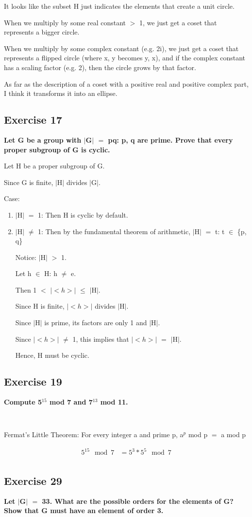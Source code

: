 \documentclass{article}
\newcommand{\mt}[1]{\ensuremath{#1}}
\newcommand\ssc[2][\DefaultOpt]{%
  \def\DefaultOpt{#2}%
  \subsection[#1]{#2}%
}
\newcommand{\elist}{\end{enumerate}}
\newcommand{\bilist}{\begin{enumerate}[label=\roman*)]}
\newcommand{\mem}{\mt{\in} }
\newcommand{\av}[1]{\mt{|}#1\mt{|}}  %
\newcommand{\bk}[1]{\{#1\}}
\newcommand{\ls}{\mt{<} }
\newcommand{\gr}{\mt{>} }
\newcommand{\lse}{\mt{\leq} }
\newcommand{\eql}{\mt{=} }
\newcommand{\uf}[2]{#1\mt{^{#2}}}
\newcommand{\eqn}[1]{\[#1\]}
\newcommand{\splt}[1]{\begin{split}#1\end{split}}
\begin{document}
{{It looks like the subset H just indicates the elements that create a unit circle.

When we multiply by some real constant \gr 1, we just get a coset that represents a bigger circle.

When we multiply by some complex constant (e.g. 2i), we just get a coset that represents a flipped circle (where x, y becomes y, x), and if the complex constant has a scaling factor (e.g. 2), then the circle grows by that factor.

As far as the description of a coset with a positive real and positive complex part, I think it transforms it into an ellipse.


}
\ssc{Exercise 17}{

\textbf{Let G be a group with \av{G} \eql pq: p, q are prime. Prove that every proper subgroup of G is cyclic.}

Let H be a proper subgroup of G.

Since G is finite, \av{H} divides \av{G}.

Case:
\bilist
\item \av{H} \eql 1: Then H is cyclic by default.
\item \av{H} $\neq$ 1: Then by the fundamental theorem of arithmetic, \av{H} \eql t: t \mem \bk{p, q}

Notice: \av{H} \gr 1.

Let h \mem H: h $\neq$ e.

Then 1 \ls \av{$<h>$} \lse \av{H}.

Since H is finite, \av{$<h>$} divides \av{H}.

Since \av{H} is prime, its factors are only 1 and \av{H}. 

Since \av{$<h>$} $\neq$ 1, this implies that \av{$<h>$} \eql \av{H}.

Hence, H must be cyclic.

\elist

}
\ssc{Exercise 19}{

\textbf{Compute \uf{5}{15} mod 7 and \uf{7}{13} mod 11.}

\

Fermat's Little Theorem: For every integer a and prime p, \uf{a}{p} mod p \eql a mod p 

\eqn{
	\splt{
		5^{15}\mod 7 & = 5^{3} * 5^5 \mod 7 \\
	}
}
}
\ssc{Exercise 29}{

\textbf{Let \av{G} \eql 33. What are the possible orders for the elements of G? Show that G must have an element of order 3.}

}}
\end{document}
